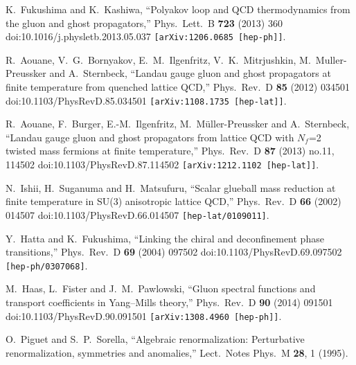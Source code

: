\documentclass[a4paper,11pt,british,twosides]{book}%
\numberwithin{equation}{section}
\begin{document}
\begin{thebibliography}{9}
  K.~Fukushima and K.~Kashiwa,
  ``Polyakov loop and QCD thermodynamics from the gluon and ghost propagators,''
  Phys.\ Lett.\ B {\bf 723} (2013) 360
  doi:10.1016/j.physletb.2013.05.037
  {\tt [arXiv:1206.0685 [hep-ph]]}.

  R.~Aouane, V.~G.~Bornyakov, E.~M.~Ilgenfritz, V.~K.~Mitrjushkin, M.~Muller-Preussker and
  A.~Sternbeck,
  ``Landau gauge gluon and ghost propagators at finite temperature from quenched lattice QCD,''
  Phys.\ Rev.\ D {\bf 85} (2012) 034501
  doi:10.1103/PhysRevD.85.034501
  {\tt [arXiv:1108.1735 [hep-lat]]}.

  R.~Aouane, F.~Burger, E.-M.~Ilgenfritz, M.~M\"uller-Preussker and A.~Sternbeck,
  ``Landau gauge gluon and ghost propagators from lattice QCD with $N_f$=2 twisted mass
  fermions at finite temperature,''
  Phys.\ Rev.\ D {\bf 87} (2013) no.11,  114502
  doi:10.1103/PhysRevD.87.114502
  {\tt [arXiv:1212.1102 [hep-lat]]}.
 
  N.~Ishii, H.~Suganuma and H.~Matsufuru,
  ``Scalar glueball mass reduction at finite temperature in SU(3) anisotropic lattice QCD,''
  Phys.\ Rev.\ D {\bf 66} (2002) 014507
  doi:10.1103/PhysRevD.66.014507
  {\tt [hep-lat/0109011]}.

  Y.~Hatta and K.~Fukushima,
  ``Linking the chiral and deconfinement phase transitions,''
  Phys.\ Rev.\ D {\bf 69} (2004) 097502
  doi:10.1103/PhysRevD.69.097502
  {\tt [hep-ph/0307068]}.

  M.~Haas, L.~Fister and J.~M.~Pawlowski,
  ``Gluon spectral functions and transport coefficients in Yang--Mills theory,''
  Phys.\ Rev.\ D {\bf 90} (2014) 091501
  doi:10.1103/PhysRevD.90.091501
  {\tt [arXiv:1308.4960 [hep-ph]]}.

  O.~Piguet and S.~P.~Sorella,
  ``Algebraic renormalization: Perturbative renormalization, symmetries and anomalies,''
  Lect.\ Notes Phys.\ M {\bf 28}, 1 (1995).








\end{thebibliography}
\end{document}

